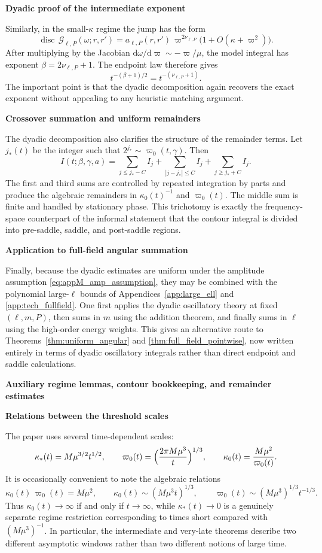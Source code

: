 \documentclass[12pt]{article}
\numberwithin{equation}{section}
\theoremstyle{plain}
\theoremstyle{definition}
\theoremstyle{remark}
\newcommand{\dd}{\mathrm d}
\newcommand{\disc}{\operatorname{disc}}
\newcommand{\cG}{\mathcal G}
\newcommand{\om}{\omega}
\newcommand{\vp}{\varpi}
\newcommand{\kap}{\kappa}
\newcommand{\appheading}[1]{\par\medskip\noindent\textbf{#1}\par\smallskip\noindent}
\newcommand{\applabelheading}[2]{\par\medskip\phantomsection\label{#2}\noindent\textbf{#1}\par\smallskip\noindent}
\begin{document}
\appheading{Dyadic proof of the intermediate exponent}

Similarly, in the small-$\kap$ regime the jump has the form
\[
   \disc\,\cG_{\ell,P}(\om;r,r')
   =
   a_{\ell,P}(r,r')\,\vp^{2\nu_{\ell,P}}
   \bigl(1+O(\kap+\vp^2)\bigr).
\]
After multiplying by the Jacobian $\dd\om/\dd\vp\sim-\vp/\mu$, the model integral has exponent $\beta=2\nu_{\ell,P}+1$.  The endpoint law therefore gives
\[
   t^{-(\beta+1)/2}
   =
   t^{-(\nu_{\ell,P}+1)}.
\]
The important point is that the dyadic decomposition again recovers the exact exponent without appealing to any heuristic matching argument.

\appheading{Crossover summation and uniform remainders}

The dyadic decomposition also clarifies the structure of the remainder terms.  Let $j_*(t)$ be the integer such that $2^{j_*}\sim\vp_0(t,\gamma)$.  Then
\[
   I(t;\beta,\gamma,a)
   =
   \sum_{j\le j_*-C}I_j
   +
   \sum_{|j-j_*|\le C}I_j
   +
   \sum_{j\ge j_*+C}I_j.
\]
The first and third sums are controlled by repeated integration by parts and produce the algebraic remainders in $\kap_0(t)^{-1}$ and $\vp_0(t)$.  The middle sum is finite and handled by stationary phase.  This trichotomy is exactly the frequency-space counterpart of the informal statement that the contour integral is divided into pre-saddle, saddle, and post-saddle regions.

\appheading{Application to full-field angular summation}

Finally, because the dyadic estimates are uniform under the amplitude assumption \eqref{eq:appM_amp_assumption}, they may be combined with the polynomial large-$\ell$ bounds of Appendices~\ref{app:large_ell} and \ref{app:tech_fullfield}.  One first applies the dyadic oscillatory theory at fixed $(\ell,m,P)$, then sums in $m$ using the addition theorem, and finally sums in $\ell$ using the high-order energy weights.  This gives an alternative route to Theorems~\ref{thm:uniform_angular} and \ref{thm:full_field_pointwise}, now written entirely in terms of dyadic oscillatory integrals rather than direct endpoint and saddle calculations.

\applabelheading{Auxiliary regime lemmas, contour bookkeeping, and remainder estimates}{app:bookkeeping}
\appheading{Relations between the threshold scales}

The paper uses several time-dependent scales:
\[
   \kap_*(t)=M\mu^{3/2}t^{1/2},
   \qquad
   \vp_0(t)=\Bigl(\frac{2\pi M\mu^3}{t}\Bigr)^{1/3},
   \qquad
   \kap_0(t)=\frac{M\mu^2}{\vp_0(t)}.
\]
It is occasionally convenient to note the algebraic relations
\[
   \kap_0(t)\,\vp_0(t)=M\mu^2,
   \qquad
   \kap_0(t)\sim (M\mu^3 t)^{1/3},
   \qquad
   \vp_0(t)\sim (M\mu^3)^{1/3}t^{-1/3}.
\]
Thus $\kap_0(t)\to\infty$ if and only if $t\to\infty$, while $\kap_*(t)\to0$ is a genuinely separate regime restriction corresponding to times short compared with $(M\mu^3)^{-1}$.  In particular, the intermediate and very-late theorems describe two different asymptotic windows rather than two different notions of large time.
\end{document}
